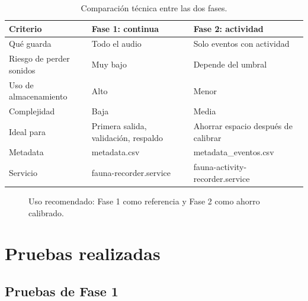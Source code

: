 \documentclass[11pt,letterpaper]{article}
\begin{document}
\begin{table}[H]
\centering
\begin{tabular}{p{} p{} p{}}
\toprule
Criterio & Fase 1: continua & Fase 2: actividad \\
\midrule
Qué guarda & Todo el audio & Solo eventos con actividad \\
Riesgo de perder sonidos & Muy bajo & Depende del umbral \\
Uso de almacenamiento & Alto & Menor \\
Complejidad & Baja & Media \\
Ideal para & Primera salida, validación, respaldo & Ahorrar espacio después de calibrar \\
Metadata & metadata.csv & metadata\_eventos.csv \\
Servicio & fauna-recorder.service & fauna-activity-recorder.service \\
\bottomrule
\end{tabular}
\caption{Comparación técnica entre las dos fases.}
\end{table}

\begin{figure}[H]
\centering
{}
\caption{Uso recomendado: Fase 1 como referencia y Fase 2 como ahorro calibrado.}
\end{figure}

\section{Pruebas realizadas}

\subsection{Pruebas de Fase 1}
\end{document}
